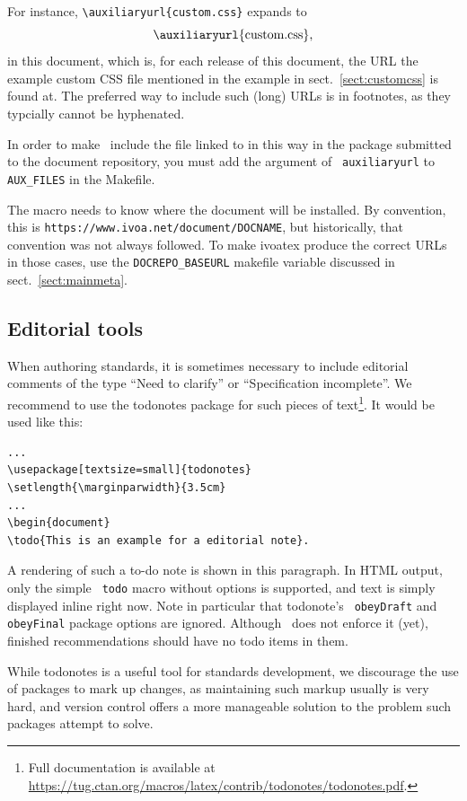 \documentclass[11pt,a4paper]{ivoa}
\newcommand{\texword}[1]{\texttt{\color{texcolor} #1}}
\begin{document}
For instance, \verb|\auxiliaryurl{custom.css}| expands to
$$\hbox{\auxiliaryurl{custom.css},}$$ in this document,
which is, for each release of this
document, the URL the example custom CSS file mentioned in the example
in sect.~\ref{sect:customcss} is found at.  The preferred way to include
such (long) URLs is in footnotes, as they typcially cannot be hyphenated.

In order to make \ivoatex~include the file linked to in this way in the
package submitted to the document repository, you must add the argument
of \texword{auxiliaryurl} to \verb|AUX_FILES| in the Makefile.

The macro needs to know where the document will be installed.  By
convention, this is \nolinkurl{https://www.ivoa.net/document/DOCNAME},
but historically, that convention was not always followed.  To make
ivoatex produce the correct URLs in those cases, use the
\verb|DOCREPO_BASEURL| makefile variable discussed in
sect.~\ref{sect:mainmeta}.

\subsection{Editorial tools}

When authoring standards, it is sometimes necessary to include
editorial comments of the type ``Need to clarify'' or ``Specification
incomplete''.  We recommend to use the todonotes package for such
pieces of text\footnote{Full documentation is available at
\url{https://tug.ctan.org/macros/latex/contrib/todonotes/todonotes.pdf}.}.
It would be used like this:
\begin{lstlisting}
...
\usepackage[textsize=small]{todonotes}
\setlength{\marginparwidth}{3.5cm}
...
\begin{document}
\todo{This is an example for a editorial note}.
\end{lstlisting}

A rendering of such a to-do note is shown in this
paragraph. In HTML output,
only the simple \texword{todo} macro without options is supported, and
text is simply displayed inline right now.  Note in particular that
todonote's \texword{obeyDraft} and \texword{obeyFinal} package options
are ignored.  Although \ivoatex\ does not enforce it (yet), finished
recommendations should have no todo items in them.

While todonotes is a useful tool for standards development, we
discourage the use of packages to mark up changes, as maintaining such
markup usually is very hard, and version control offers a more
manageable solution to the problem such packages attempt to solve.
\end{document}
